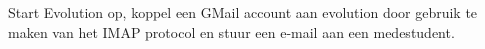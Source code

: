 Start Evolution op, koppel een GMail account aan evolution door gebruik te maken van het IMAP protocol en stuur een e-mail aan een medestudent.
